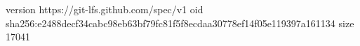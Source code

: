 version https://git-lfs.github.com/spec/v1
oid sha256:e2488decf34cabc98eb63bf79fc81f5f8ecdaa30778ef14f05e119397a161134
size 17041
